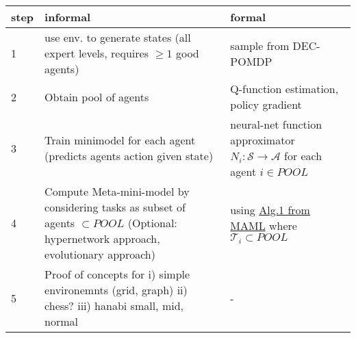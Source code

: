 \documentclass[a4paper, 11pt]{article}
\begin{document}
\begin{tabularx}{\textwidth}{|l|X|X|}
    step & informal & formal \\
\hline
    1 & use env. to generate states 
		(all expert levels, requires $\geq 1$  good agents)  
	& sample from DEC-POMDP \\
    2 & Obtain pool of agents 
	& Q-function estimation, policy gradient\\
    3 & Train minimodel for each agent (predicts agents action given state) & neural-net function approximator $N_i: \mathcal{S} \rightarrow \mathcal{A}$ for each agent $i \in POOL$\\
   4 & Compute Meta-mini-model by considering tasks as subset of agents $\subset POOL$ (Optional: hypernetwork approach, evolutionary approach) & using \href{https://proceedings.mlr.press/v70/finn17a/finn17a.pdf}{Alg.1 from MAML} where $\mathcal{T}_i \subset{POOL}$ \\
  5 & Proof of concepts for i) simple environemnts (grid, graph)  ii) chess? iii) hanabi small, mid, normal & -
\end{tabularx}
\end{document}
